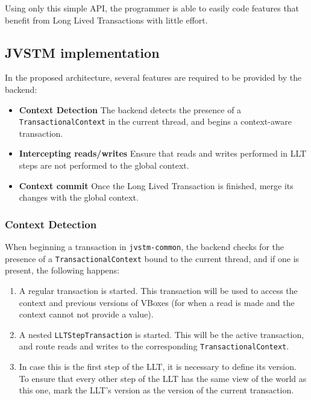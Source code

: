 Using only this simple API, the programmer is able to easily code
features that benefit from Long Lived Transactions with little effort.

\subsection{JVSTM implementation}

In the proposed architecture, several features are required to be
provided by the backend:

\begin{itemize}

\item {\bf Context Detection} The backend detects the presence of a
  \texttt{TransactionalContext} in the current thread, and begins a
  context-aware transaction.

\item {\bf Intercepting reads/writes} Ensure that reads and writes
  performed in LLT steps are not performed to the global context.

\item {\bf Context commit} Once the Long Lived Transaction is
  finished, merge its changes with the global context.

\end{itemize}

\subsubsection{Context Detection}

When beginning a transaction in \texttt{jvstm-common}, the backend
checks for the presence of a \texttt{TransactionalContext} bound to
the current thread, and if one is present, the following happens:

\begin{enumerate}

\item A regular transaction is started. This transaction will be used
  to access the context and previous versions of VBoxes (for when a
  read is made and the context cannot not provide a value).

\item A nested \texttt{LLTStepTransaction} is started. This will be the
  active transaction, and route reads and writes to the corresponding
  \texttt{TransactionalContext}.

\item In case this is the first step of the LLT, it is necessary to
  define its version. To ensure that every other step of the LLT has
  the same view of the world as this one, mark the LLT's version as
  the version of the current transaction.

\end{enumerate}

